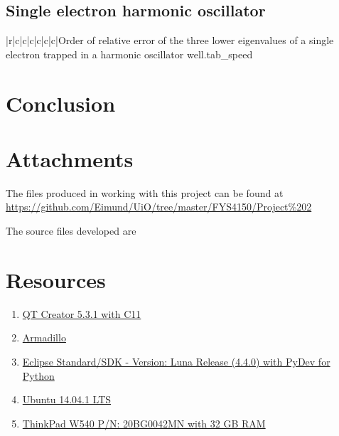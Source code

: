 \documentclass[11pt,english,a4paper]{article}
\begin{document}
\begin{flushleft}
\subsection{Single electron harmonic oscillator}

\begin{tabell}{|r|c|c|c|c|c|c|}{\small}{}{}{Order of relative error of the three lower eigenvalues of a single electron trapped in a harmonic oscillator well.}{tab_speed}
\end{tabell}

\section{Conclusion}

\section{Attachments}

The files produced in working with this project can be found at \href{https://github.com/Eimund/UiO/tree/master/FYS4150/Project\%202}{https://github.com/Eimund/UiO/tree/master/FYS4150/Project\%202} \linebreak

The source files developed are

\section{Resources}

\begin{enumerate}
\item{\href{http://qt-project.org/downloads}{QT Creator 5.3.1 with C11}}
\item{\href{http://arma.sourceforge.net/}{Armadillo}}
\item{\href{https://www.eclipse.org/downloads/}{Eclipse Standard/SDK  - Version: Luna Release (4.4.0) with PyDev for Python}}
\item{\href{http://www.ubuntu.com/download/desktop}{Ubuntu 14.04.1 LTS}}
\item{\href{http://shop.lenovo.com/no/en/laptops/thinkpad/w-series/w540/#tab-reseller}{ThinkPad W540 P/N: 20BG0042MN with 32 GB RAM}}
\end{enumerate}


\end{flushleft}
\end{document}
